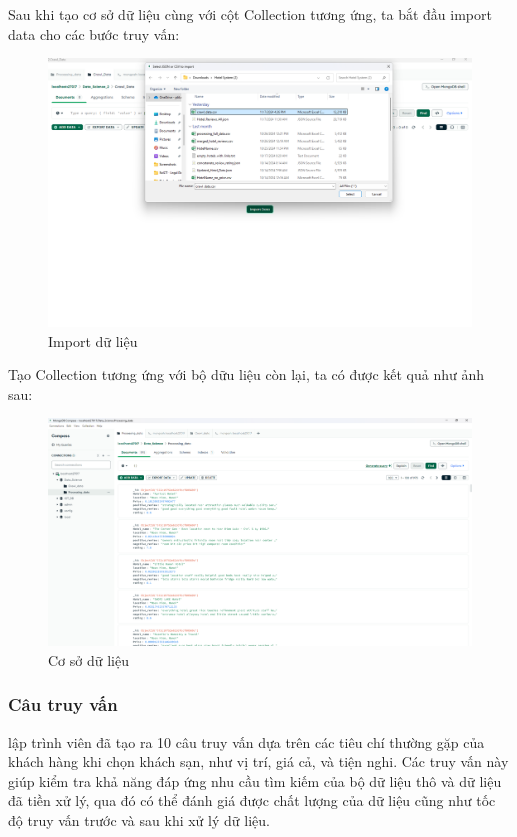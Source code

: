 Sau khi tạo cơ sở dữ liệu cùng với cột Collection tương ứng, ta bắt đầu import data cho các bước truy vấn:

\begin{figure}[H]
    \centering
    \includegraphics[width=0.9\linewidth]{Figures/11.2.png}
    \caption{Import dữ liệu}
\end{figure}

Tạo Collection tương ứng với bộ dữu liệu còn lại, ta có được kết quả như ảnh sau:

\begin{figure}[H]
    \centering
    \includegraphics[width=1.0\linewidth]{Figures/11.3.png}
    \caption{Cơ sở dữ liệu}
\end{figure}

\subsubsection{Câu truy vấn}
lập trình viên đã tạo ra 10 câu truy vấn dựa trên các tiêu chí thường gặp của khách hàng khi chọn khách sạn, như vị trí, giá cả, và tiện nghi. Các truy vấn này giúp kiểm tra khả năng đáp ứng nhu cầu tìm kiếm của bộ dữ liệu thô và dữ liệu đã tiền xử lý, qua đó có thể đánh giá được chất lượng của dữ liệu cũng như tốc độ truy vấn trước và sau khi xử lý dữ liệu.

